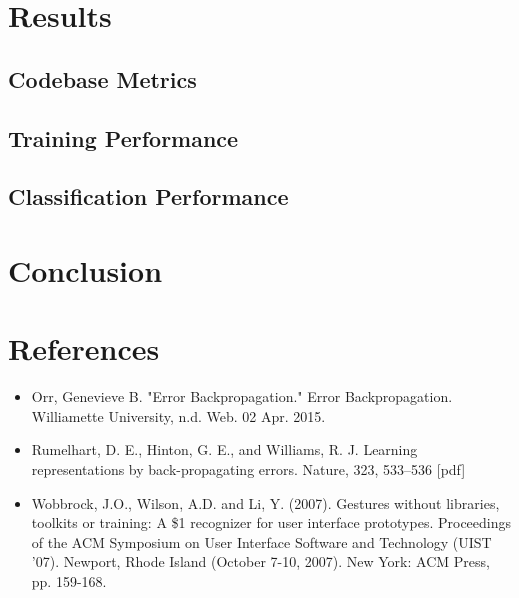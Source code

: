 \documentclass{report}
\begin{document}

\chapter{Results}

\section{Codebase Metrics}


\section{Training Performance}


\section{Classification Performance}


\chapter{Conclusion}


\chapter{References}
\begin{itemize}
\item Orr, Genevieve B. "Error Backpropagation." Error Backpropagation. Williamette University, n.d. Web. 02 Apr. 2015.
\item Rumelhart, D. E., Hinton, G. E., and Williams, R. J. Learning representations by back-propagating errors. Nature, 323, 533--536 [pdf]
\item Wobbrock, J.O., Wilson, A.D. and Li, Y. (2007). Gestures without libraries, toolkits or training: A \$1 recognizer for user interface prototypes. Proceedings of the ACM Symposium on User Interface Software and Technology (UIST '07). Newport, Rhode Island (October 7-10, 2007). New York: ACM Press, pp. 159-168.

\end{itemize}
\end{document}
